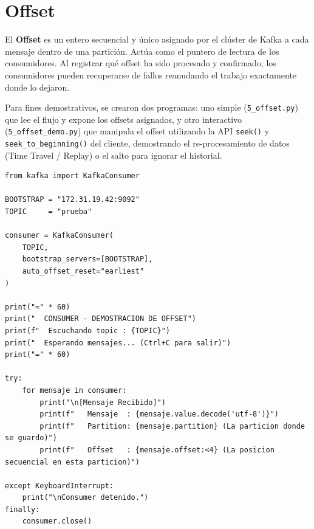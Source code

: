 \documentclass{practicaEPCC}
\begin{document}
\section{Offset}

El \textbf{Offset} es un entero secuencial y único asignado por el clúster de Kafka a cada mensaje dentro de una partición. Actúa como el puntero de lectura de los consumidores. Al registrar qué offset ha sido procesado y confirmado, los consumidores pueden recuperarse de fallos reanudando el trabajo exactamente donde lo dejaron.

Para fines demostrativos, se crearon dos programas: uno simple (\texttt{5\_offset.py}) que lee el flujo y expone los offsets asignados, y otro interactivo (\texttt{5\_offset\_demo.py}) que manipula el offset utilizando la API \texttt{seek()} y \texttt{seek\_to\_beginning()} del cliente, demostrando el re-procesamiento de datos (Time Travel / Replay) o el salto para ignorar el historial.

\begin{lstlisting}[style=pythonstyle, caption={Consumidor que expone offsets (5\_offset.py)}]
from kafka import KafkaConsumer

BOOTSTRAP = "172.31.19.42:9092"
TOPIC     = "prueba"

consumer = KafkaConsumer(
    TOPIC,
    bootstrap_servers=[BOOTSTRAP],
    auto_offset_reset="earliest"
)

print("=" * 60)
print("  CONSUMER - DEMOSTRACION DE OFFSET")
print(f"  Escuchando topic : {TOPIC}")
print("  Esperando mensajes... (Ctrl+C para salir)")
print("=" * 60)

try:
    for mensaje in consumer:
        print("\n[Mensaje Recibido]")
        print(f"   Mensaje  : {mensaje.value.decode('utf-8')}")
        print(f"   Partition: {mensaje.partition} (La particion donde se guardo)")
        print(f"   Offset   : {mensaje.offset:<4} (La posicion secuencial en esta particion)")

except KeyboardInterrupt:
    print("\nConsumer detenido.")
finally:
    consumer.close()
\end{lstlisting}
\end{document}
